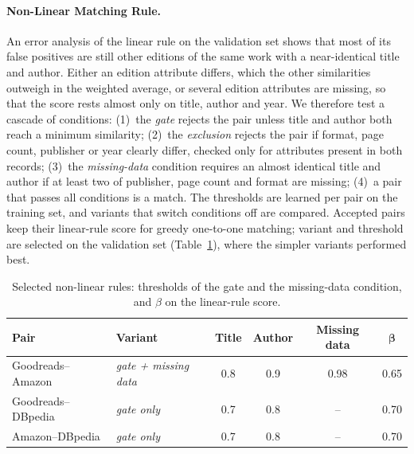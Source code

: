 \documentclass[runningheads]{llncs}
\begin{document}
\paragraph{Non-Linear Matching Rule.}
An error analysis of the linear rule on the validation set shows that most of
its false positives are still other editions of the same work with a
near-identical title and author. Either an edition attribute differs, which the
other similarities outweigh in the weighted average, or several edition
attributes are missing, so that the score rests almost only on title, author and
year. We therefore test a cascade of conditions:
(1)~the \emph{gate} rejects the pair unless title and author both reach a
minimum similarity; (2)~the \emph{exclusion} rejects the pair if format, page
count, publisher or year clearly differ, checked only for attributes present in
both records; (3)~the \emph{missing-data} condition requires an almost identical
title and author if at least two of publisher, page count and format are
missing; (4)~a pair that passes all conditions is a match. The thresholds are
learned per pair on the training set, and variants that switch conditions off
are compared. Accepted pairs keep their linear-rule score for greedy one-to-one
matching; variant and threshold are selected on the validation set
(Table~\ref{tab:nonlinrule}), where the simpler variants performed best.

\begin{table}[htbp]
\centering
\caption{Selected non-linear rules: thresholds of the gate and the missing-data
condition, and $\beta$ on the linear-rule score.}
\label{tab:nonlinrule}
\footnotesize
\setlength{\tabcolsep}{2pt}
\begin{tabular}{llcccc}
\toprule
\textbf{Pair} & \textbf{Variant} & \textbf{Title} & \textbf{Author} & \textbf{Missing data} & $\boldsymbol{\beta}$ \\
\midrule
Goodreads--Amazon  & \emph{gate + missing data} & 0.8 & 0.9 & 0.98 & 0.65 \\
Goodreads--DBpedia & \emph{gate only}         & 0.7 & 0.8 & --   & 0.70 \\
Amazon--DBpedia    & \emph{gate only}         & 0.7 & 0.8 & --   & 0.70 \\
\bottomrule
\end{tabular}
\end{table}

\end{document}
